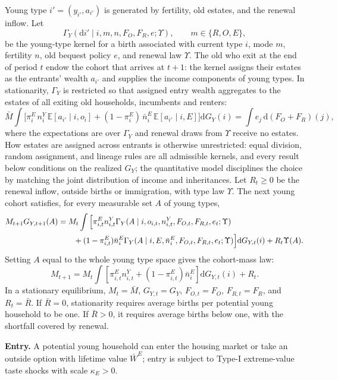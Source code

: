 \documentclass[11pt]{article}
\newcommand{\dd}{\mathrm d}
\newcommand{\E}{\mathbb E}
\newcommand{\1}{\mathbf 1}
\begin{document}
Young type $i'=(y_{i'},a_{i'})$ is generated by fertility, old estates, and the renewal inflow. Let
\[
\Gamma_Y(\dd i'\mid i,m,n,F_O,F_R,e;\Upsilon),
\qquad m\in\{R,O,E\},
\]
be the young-type kernel for a birth associated with current type $i$, mode $m$, fertility $n$, old bequest policy $e$, and renewal law $\Upsilon$. The old who exit at the end of period $t$ endow the cohort that arrives at $t+1$: the kernel assigns their estates as the entrants' wealth $a_{i'}$ and supplies the income components of young types. In stationarity, $\Gamma_Y$ is restricted so that assigned entry wealth aggregates to the estates of all exiting old households, incumbents and renters:
\[
\bar M\int\Big[
\pi_i^E\,n_i^{Y}\,\E\!\left[a_{i'}\mid i,o_i\right]
+(1-\pi_i^E)\,\bar n_i^E\,\E\!\left[a_{i'}\mid i,E\right]
\Big]\dd G_Y(i)
=
\int e_j\,\dd\!\left(F_O+F_R\right)(j),
\]
where the expectations are over $\Gamma_Y$ and renewal draws from $\Upsilon$ receive no estates. How estates are assigned across entrants is otherwise unrestricted: equal division, random assignment, and lineage rules are all admissible kernels, and every result below conditions on the realized $G_Y$; the quantitative model disciplines the choice by matching the joint distribution of income and inheritances. Let $R_t\ge0$ be the renewal inflow, outside births or immigration, with type law $\Upsilon$. The next young cohort satisfies, for every measurable set $A$ of young types,
\begin{align}
M_{t+1}G_{Y,t+1}(A)
&=
M_t\int
\Big[
\pi_{i,t}^E n_{i,t}^{Y}
\Gamma_Y(A\mid i,o_{i,t},n_{i,t}^{Y},F_{O,t},F_{R,t},e_t;\Upsilon)
\notag\\
&\qquad
+(1-\pi_{i,t}^E)\bar n_i^E
\Gamma_Y(A\mid i,E,\bar n_i^E,F_{O,t},F_{R,t},e_t;\Upsilon)
\Big]\dd G_{Y,t}(i)
+
R_t\Upsilon(A).
\label{eq:compact_young_transition}
\end{align}
Setting $A$ equal to the whole young type space gives the cohort-mass law:
\begin{equation}
M_{t+1}
=
M_t\int
\left[
\pi_{i,t}^E n_{i,t}^{Y}
+(1-\pi_{i,t}^E)\bar n_i^E
\right]
\dd G_{Y,t}(i)
+R_t.
\label{eq:compact_cohort_mass_law}
\end{equation}
In a stationary equilibrium, $M_t=\bar M$, $G_{Y,t}=G_Y$, $F_{O,t}=F_O$, $F_{R,t}=F_R$, and $R_t=\bar R$. If $\bar R=0$, stationarity requires average births per potential young household to be one. If $\bar R>0$, it requires average births below one, with the shortfall covered by renewal.

\textbf{Entry.} A potential young household can enter the housing market or take an outside option with lifetime value $\bar W^E$; entry is subject to Type-I extreme-value taste shocks with scale $\kappa_E>0$.
\end{document}
